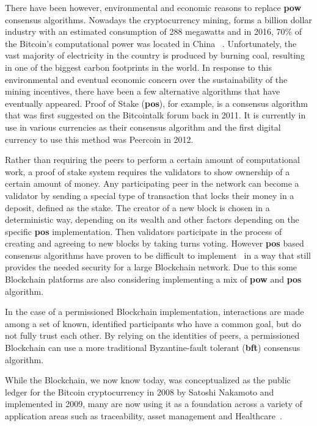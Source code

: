 There have been however, environmental and economic reasons to replace
\textbf{pow} consensus algorithms. Nowadays the cryptocurrency mining, forms a
billion dollar industry with an estimated consumption of 288 megawatts and in
2016, 70\% of the Bitcoin's computational power was located in China
~\cite{BitcoinMining2017}.  Unfortunately, the vast majority of electricity in
the country is produced by burning coal, resulting in one of the biggest carbon
footprints in the world. In response to this environmental and eventual
economic concern over the sustainability of the mining incentives, there have
been a few alternative algorithms that have eventually appeared. Proof of Stake
(\textbf{pos}), for example, is a consensus algorithm that was first suggested
on the Bitcointalk forum back in 2011. It is currently in use in various
currencies as their consensus algorithm and the first digital currency to use
this method was Peercoin in 2012. 

Rather than requiring the peers to perform a certain amount of computational
work, a proof of stake system requires the validators to show ownership of a
certain amount of money. Any participating peer in the network can become a
validator by sending a special type of transaction that locks their money in a
deposit, defined as the stake. The creator of a new block is chosen in a
deterministic way, depending on its wealth and other factors depending on the
specific \textbf{pos} implementation. Then validators participate in the
process of creating and agreeing to new blocks by taking turns voting. However
\textbf{pos} based consensus algorithms have proven to be difficult to
implement~\cite{EthereumSlasher2014} in a way that still provides the needed
security for a large Blockchain network. Due to this some Blockchain platforms
are also considering implementing a mix of \textbf{pow} and \textbf{pos}
algorithm.

In the case of a permissioned Blockchain implementation, interactions are made
among a set of known, identified participants who have a common goal, but do
not fully trust each other. By relying on the identities of peers, a
permissioned Blockchain can use a more traditional Byzantine-fault tolerant
(\textbf{bft}) consensus algorithm.

While the Blockchain, we now know today, was conceptualized as the public
ledger for the Bitcoin cryptocurrency in 2008 by Satoshi Nakamoto and
implemented in 2009, many are now using it as a foundation across a variety of
application areas such as traceability, asset management and
Healthcare~\cite{MIT2016}.

